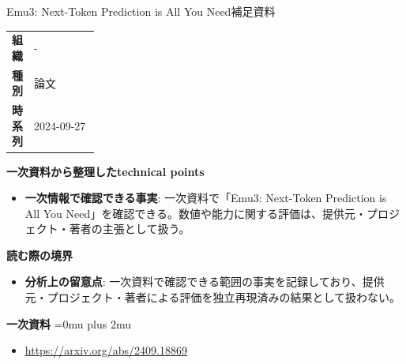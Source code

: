 \begin{technicalnote}{Emu3: Next-Token Prediction is All You Need}{補足資料}
\begingroup
\begin{tabularx}{\linewidth}{@{}>{\bfseries}p{0.22\linewidth}X@{}}
組織 & - \\
種別 & 論文 \\
時系列 & 2024-09-27 \\
\end{tabularx}
\smallskip
{\bfseries 一次資料から整理したtechnical points}
\begin{itemize}[leftmargin=1.5em,itemsep=0.35em]
\item \textbf{一次情報で確認できる事実}: 一次資料で「Emu3: Next-Token Prediction is All You Need」を確認できる。数値や能力に関する評価は、提供元・プロジェクト・著者の主張として扱う。
\end{itemize}
\begin{minipage}{\linewidth}
{\bfseries 読む際の境界}
\begin{itemize}[leftmargin=1.5em,itemsep=0.35em]
\item \textbf{分析上の留意点}: 一次資料で確認できる範囲の事実を記録しており、提供元・プロジェクト・著者による評価を独立再現済みの結果として扱わない。
\end{itemize}
\begin{samepage}
{\bfseries 一次資料}
\begingroup\sloppy
\Urlmuskip=0mu plus 2mu\relax
\begin{itemize}[leftmargin=1.5em,itemsep=0.25em]
\item {\scriptsize\url{https://arxiv.org/abs/2409.18869}}
\end{itemize}
\endgroup
\end{samepage}
\end{minipage}
\endgroup
\end{technicalnote}
\medskip

